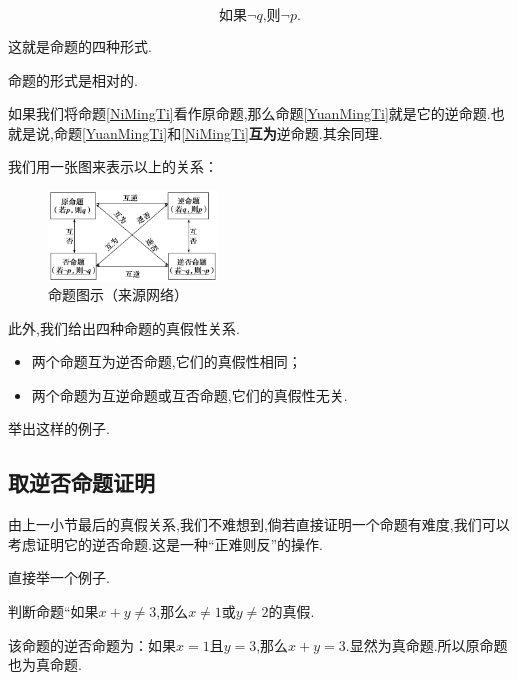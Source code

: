 \documentclass[lang=cn,math=cm,chinesefont=nofont,11pt,scheme=chinese,twocol]{elegantbook}
\begin{document}
\begin{equation}\label{NiFouMingTi}
  \text{如果}\neg q\text{,则}\neg p.
\end{equation}

这就是命题的四种形式.

命题的形式是相对的.

如果我们将命题\ref{NiMingTi}看作原命题,那么命题\ref{YuanMingTi}就是它的逆命题.也就是说,命题\ref{YuanMingTi}和\ref{NiMingTi}\textbf{互为}逆命题.其余同理.

我们用一张图来表示以上的关系：

\begin{figure}[h]
  \centering
  \includegraphics[width=0.4\textwidth]{image/proposition.png}
  \caption{命题图示（来源网络）}
  \label{img:proposition}
\end{figure}

此外,我们给出四种命题的真假性关系.

\begin{itemize}
  \item 两个命题互为逆否命题,它们的真假性相同；
  \item 两个命题为互逆命题或互否命题,它们的真假性无关.
\end{itemize}

\begin{problem}
  举出这样的例子.
\end{problem}

\subsection{取逆否命题证明}

由上一小节最后的真假关系,我们不难想到,倘若直接证明一个命题有难度,我们可以考虑证明它的逆否命题.这是一种“正难则反”的操作.

直接举一个例子.

\begin{example}
  判断命题“如果$x+y\neq 3$,那么$x\neq 1$或$y\neq 2$的真假.
\end{example}

\begin{solution}
  该命题的逆否命题为：如果$x=1$且$y=3$,那么$x+y=3$.显然为真命题.所以原命题也为真命题.
\end{solution}
\end{document}
